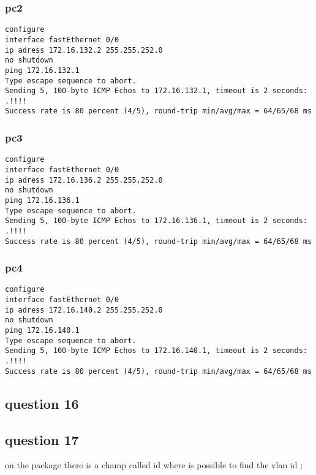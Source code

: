 \documentclass[11pt]{article}
\begin{document}
\subsubsection{pc2}
\label{sec:orgheadline32}

\begin{verbatim}
configure
interface fastEthernet 0/0
ip adress 172.16.132.2 255.255.252.0
no shutdown
ping 172.16.132.1
Type escape sequence to abort.
Sending 5, 100-byte ICMP Echos to 172.16.132.1, timeout is 2 seconds:
.!!!!
Success rate is 80 percent (4/5), round-trip min/avg/max = 64/65/68 ms
\end{verbatim}

\subsubsection{pc3}
\label{sec:orgheadline33}

\begin{verbatim}
configure
interface fastEthernet 0/0
ip adress 172.16.136.2 255.255.252.0
no shutdown
ping 172.16.136.1
Type escape sequence to abort.
Sending 5, 100-byte ICMP Echos to 172.16.136.1, timeout is 2 seconds:
.!!!!
Success rate is 80 percent (4/5), round-trip min/avg/max = 64/65/68 ms
\end{verbatim}



\subsubsection{pc4}
\label{sec:orgheadline34}

\begin{verbatim}
configure
interface fastEthernet 0/0
ip adress 172.16.140.2 255.255.252.0
no shutdown
ping 172.16.140.1
Type escape sequence to abort.
Sending 5, 100-byte ICMP Echos to 172.16.140.1, timeout is 2 seconds:
.!!!!
Success rate is 80 percent (4/5), round-trip min/avg/max = 64/65/68 ms
\end{verbatim}


\subsection{question 16}
\label{sec:orgheadline36}
\subsection{question 17}
\label{sec:orgheadline37}
on the package there is a champ called id where is possible to find the vlan id ;
\end{document}

